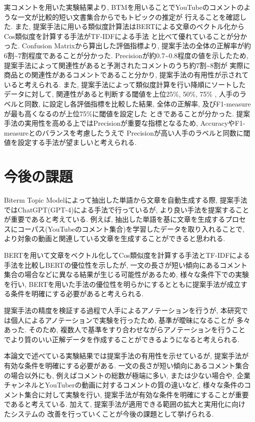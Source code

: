 \documentclass{ltjarticle}
\begin{document}
実コメントを用いた実験結果より, BTMを用いることでYouTubeのコメントのような一文が比較的短い文書集合からでもトピックの推定が
行えることを確認した. また, 提案手法に用いる類似度計算法はBERTによる文章のベクトル化からCos類似度を計算する手法がTF-IDFによる手法
と比べて優れていることが分かった. Confusion Matrixから算出した評価指標より, 提案手法の全体の正解率が約6割\sim7割程度であることが分かった. 
Precisionが約0.7\sim0.8程度の値を示したため, 提案手法によって関連性があると予測されたコメントのうち約7割\sim8割が
実際に商品との関連性があるコメントであること分かり, 提案手法の有用性が示されていると考えられる. 
また, 提案手法によって類似度計算を行い降順にソートしたデータに対して, 関連性があると判断する閾値を上位25\%, 50\%, 75\%
, 人手のラベルと同数, に設定し各評価指標を比較した結果, 全体の正解率, 及びF1-measureが最も高くなるのが上位75\%に閾値を設定した
ときであることが分かった. 
提案手法の実用性を高める上ではPrecisionが重要な指標となるため, AccuracyやF1-measureとのバランスを考慮したうえで
Precisionが高い人手のラベルと同数に閾値を設定する手法が望ましいと考えられる. 

\newpage
\section{今後の課題}
Biterm Topic Modelによって抽出した単語から文章を自動生成する際, 提案手法ではChatGPT(GPT-4)による手法で行っているが, 
より良い手法を提案することが重要であると考えている. 
例えば, 抽出した単語を基に文章を生成するプロセスにコーパス(YouTubeのコメント集合)を学習したデータを取り入れることで, 
より対象の動画と関連している文章を生成することができると思われる. 

BERTを用いて文章をベクトル化してCos類似度を計算する手法とTF-IDFによる手法を比較しBERTの優位性を示したが, 
一文の長さが短い傾向にあるコメント集合の場合などに異なる結果が生じる可能性があるため, 
様々な条件下での実験を行い, BERTを用いた手法の優位性を明らかにするとともに提案手法が成立する条件を明確にする必要があると考えられる. 

提案手法の精度を検証する過程で人手によるアノテーションを行うが, 本研究では個人によるアノテーションで実験を行ったため, 基準が曖昧になることが
多々あった. そのため, 複数人で基準をすり合わせながらアノテーションを行うことでより質のいい正解データを作成することができるようになると考えられる. 

本論文で述べている実験結果では提案手法の有用性を示せているが, 提案手法が有効な条件を明確にする必要がある. 
一文の長さが短い傾向にあるコメント集合の場合以外にも, 例えばコメントの総数が極端に多い, または少ない場合や, 
企業チャンネルとYouTuberの動画に対するコメントの質の違いなど, 様々な条件のコメント集合に対して実験を行い, 
提案手法が有効な条件を明確にすることが重要であると考えている. 加えて, 提案手法が適用できる範囲の拡大と実用化に向けたシステムの
改善を行っていくことが今後の課題として挙げられる. 
\end{document}
